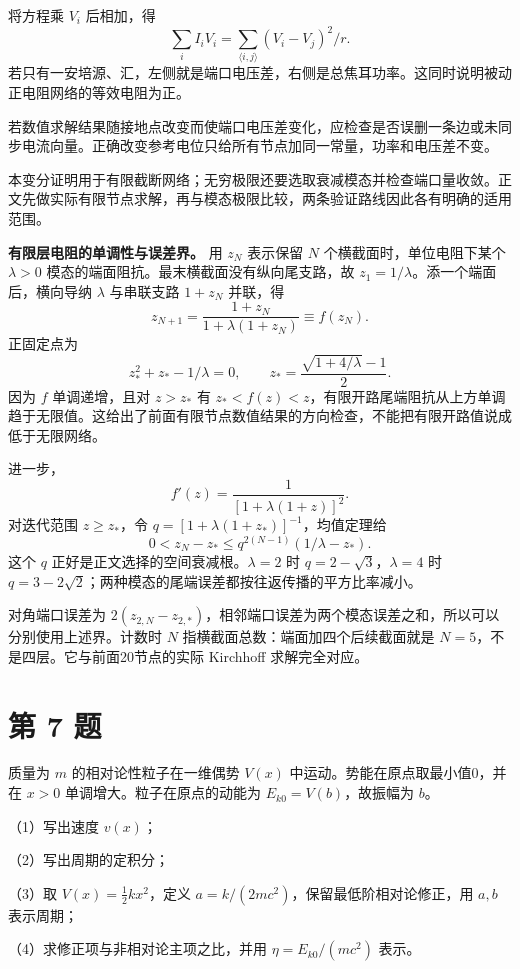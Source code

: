 \documentclass[12pt,a4paper,UTF8]{ctexart}
\begin{document}
将方程乘 \(V_i\) 后相加，得 \[
\sum_iI_iV_i=\sum_{\langle i,j\rangle}(V_i-V_j)^2/r.
\]
若只有一安培源、汇，左侧就是端口电压差，右侧是总焦耳功率。这同时说明被动正电阻网络的等效电阻为正。

若数值求解结果随接地点改变而使端口电压差变化，应检查是否误删一条边或未同步电流向量。正确改变参考电位只给所有节点加同一常量，功率和电压差不变。

本变分证明用于有限截断网络；无穷极限还要选取衰减模态并检查端口量收敛。正文先做实际有限节点求解，再与模态极限比较，两条验证路线因此各有明确的适用范围。

\textbf{有限层电阻的单调性与误差界。} 用 \(z_N\) 表示保留 \(N\)
个横截面时，单位电阻下某个 \(\lambda>0\)
模态的端面阻抗。最末横截面没有纵向尾支路，故
\(z_1=1/\lambda\)。添一个端面后，横向导纳 \(\lambda\) 与串联支路
\(1+z_N\) 并联，得 \[
z_{N+1}=\frac{1+z_N}{1+\lambda(1+z_N)}\equiv f(z_N).
\] 正固定点为 \[
z_*^2+z_*-1/\lambda=0,
\qquad z_*=\frac{\sqrt{1+4/\lambda}-1}{2}.
\] 因为 \(f\) 单调递增，且对 \(z>z_*\) 有
\(z_*<f(z)<z\)，有限开路尾端阻抗从上方单调趋于无限值。这给出了前面有限节点数值结果的方向检查，不能把有限开路值说成低于无限网络。

进一步， \[
f'(z)=\frac1{[1+\lambda(1+z)]^2}.
\] 对迭代范围 \(z\ge z_*\)，令 \(q=[1+\lambda(1+z_*)]^{-1}\)，均值定理给
\[
0<z_N-z_*\le q^{2(N-1)}(1/\lambda-z_*).
\] 这个 \(q\) 正好是正文选择的空间衰减根。\(\lambda=2\) 时
\(q=2-\sqrt3\)，\(\lambda=4\) 时
\(q=3-2\sqrt2\)；两种模态的尾端误差都按往返传播的平方比率减小。

对角端口误差为
\(2(z_{2,N}-z_{2,*})\)，相邻端口误差为两个模态误差之和，所以可以分别使用上述界。计数时
\(N\) 指横截面总数：端面加四个后续截面就是
\(N=5\)，不是四层。它与前面20节点的实际 Kirchhoff 求解完全对应。

\newpage

\section{第 7 题}\label{ux7b2c-7-ux9898}

质量为 \(m\) 的相对论性粒子在一维偶势 \(V(x)\)
中运动。势能在原点取最小值0，并在 \(x>0\) 单调增大。粒子在原点的动能为
\(E_{k0}=V(b)\)，故振幅为 \(b\)。

（1）写出速度 \(v(x)\)；

（2）写出周期的定积分；

（3）取 \(V(x)=\frac12kx^2\)，定义
\(a=k/(2mc^2)\)，保留最低阶相对论修正，用 \(a,b\) 表示周期；

（4）求修正项与非相对论主项之比，并用 \(\eta=E_{k0}/(mc^2)\) 表示。
\end{document}
